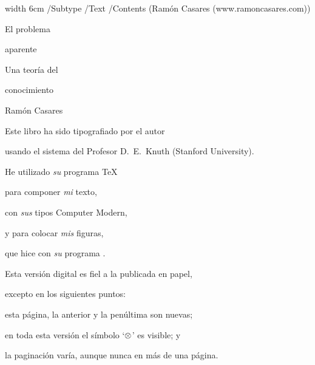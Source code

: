 
\pdfcode%
 \pdfannot width 6cm {/Subtype /Text
  /Contents (Ramón Casares (www.ramoncasares.com))}
\pdfendcode


\nopagenumbers
\background
\pdfWhite

\hbox{}
\vskip1.3in
\centerline{\ptitlefont El problema}
\vskip1pc
\centerline{\ptitlefont aparente}

\vskip10pc
\centerline{\psubtitlefont Una teoría del}
\vskip6pt
\centerline{\psubtitlefont conocimiento}

\vskip2pc
\centerline{\pauthorfont Ramón Casares}
\pdfBlack

\vfil

\break %

\null \vfill

 Este libro ha sido tipografiado por el autor\par
 usando el sistema del Profesor D.~E.~Knuth (Stanford University).\par
 He utilizado {\em su} programa \TeX\par
 para componer {\em mi} texto,\par
 con {\em sus} tipos Computer Modern,\par
 y para colocar {\em mis} figuras,\par
 que hice con {\em su} programa \METAFONT.\par

\vglue 2pc

Esta versión digital es fiel a la publicada en papel,\par
excepto en los siguientes puntos:\par
esta página, la anterior y la penúltima son nuevas;\par 
en toda esta versión el símbolo `$\prl$' es visible; y\par
la paginación varía, aunque nunca en más de una página.\par

\vglue 2pc

\def\timestamp{\the\year.%
 \ifnum\month<10 0\fi \the\month.%
 \ifnum\day<10 0\fi\the\day:%
  \count255=\time \divide\count255 by 60
 \ifnum\count255<10 0\fi \the\count255.%
  \multiply\count255 by 60 \advance\count255 by -\time
  \multiply\count255 by -1
 \ifnum\count255<10 0\fi \the\count255}

